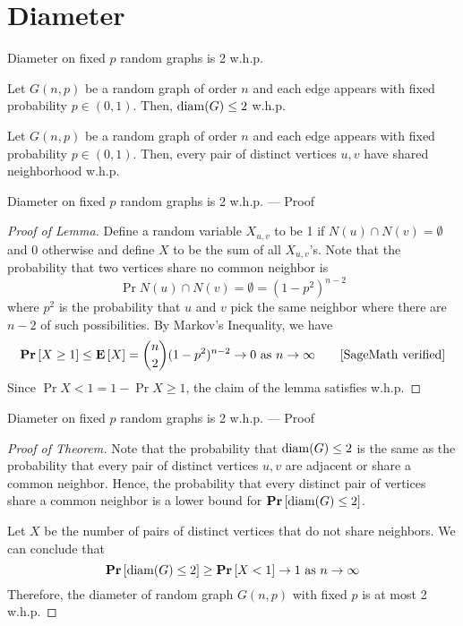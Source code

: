 \section{Diameter}

\begin{frame}{Diameter on fixed $p$ random graphs is 2 w.h.p.}
    \begin{theorem}
        Let \(G(n, p)\) be a random graph of order $n$ and each edge appears with fixed probability $p \in (0, 1)$. 
        Then, \(\operatorname{diam}(G) \leq 2\) w.h.p.
    \end{theorem}

    \begin{lemma}
        Let \(G(n, p)\) be a random graph of order $n$ and each edge appears with fixed probability $p \in (0, 1)$. 
        Then, every pair of distinct vertices $u, v$ have shared neighborhood w.h.p.
    \end{lemma}
\end{frame}

\begin{frame}{Diameter on fixed $p$ random graphs is 2 w.h.p. --- Proof}
    \begin{proof}[Proof of Lemma]
        Define a random variable $X_{u, v}$ to be 1 if $N(u) \cap N(v) = \emptyset$ and 0 otherwise and define $X$ to be the sum of all $X_{u, v}$'s. Note that the probability that two vertices share no common neighbor is
        \[ \Pr{N(u) \cap N(v) = \emptyset} = (1-p^2)^{n-2} \]
        where $p^2$ is the probability that $u$ and $v$ pick the same neighbor where there are $n-2$ of such possibilities.
        By Markov's Inequality, we have
        \[
        \begin{aligned}
            \mathbf{Pr}\left[X \geq 1\right] \leq \mathbf{E}\left[X\right]
                          = \binom{n}{2}(1-p^2)^{n-2} \to 0 \text{ as } n \to \infty \qquad \text{[SageMath verified]}
        \end{aligned}
        \]
        Since $\Pr{X < 1} = 1 - \Pr{X \geq 1}$, the claim of the lemma satisfies w.h.p.
    \end{proof}
\end{frame}

\begin{frame}{Diameter on fixed $p$ random graphs is 2 w.h.p. --- Proof}
    \begin{proof}[Proof of Theorem]
        Note that the probability that $\operatorname{diam}(G) \leq 2$ is the same as the probability that every pair of distinct vertices $u, v$ are adjacent or share a common neighbor. Hence, the probability that every distinct pair of vertices share a common neighbor is a lower bound for $\mathbf{Pr}\left[\operatorname{diam}(G) \leq 2\right]$.

        Let $X$ be the number of pairs of distinct vertices that do not share neighbors. We can conclude that
        \[ \mathbf{Pr}\left[\operatorname{diam}(G) \leq 2\right] \geq \mathbf{Pr}\left[X < 1\right] \to 1 \text{ as } n \to \infty \]
        Therefore, the diameter of random graph $G(n, p)$ with fixed $p$ is at most 2 w.h.p.
    \end{proof}
\end{frame}
